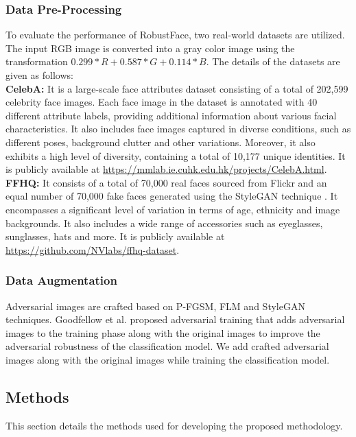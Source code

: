 \documentclass[sn-mathphys]{sn-jnl}%
\theoremstyle{thmstyleone}%
\theoremstyle{thmstyletwo}%
\theoremstyle{thmstylethree}%
\begin{document}
 \subsubsection{Data Pre-Processing}
 To evaluate the performance of  RobustFace, two real-world datasets are utilized. The input RGB image is converted into a gray color image using the transformation $0.299*R + 0.587*G + 0.114*B$. The details of the datasets are given as follows: \\
 \textbf{CelebA:} It is a large-scale face attributes dataset consisting of a total of 202,599 celebrity face images. Each face image in the dataset is annotated with 40 different attribute labels, providing additional information about various facial characteristics. It also includes face images captured in diverse conditions, such as different poses, background clutter and other variations. Moreover, it also exhibits a high level of diversity, containing a total of 10,177 unique identities. It is publicly available at \url{https://mmlab.ie.cuhk.edu.hk/projects/CelebA.html}. \\
 \textbf{FFHQ:}
 It consists of a total of 70,000 real faces sourced from Flickr and an equal number of 70,000 fake faces generated using the StyleGAN technique \cite{karras2019style}. It encompasses a significant level of variation in terms of age, ethnicity and image backgrounds. It also includes a wide range of accessories such as eyeglasses, sunglasses, hats and more. It is publicly available at \url{https://github.com/NVlabs/ffhq-dataset}.

 \subsubsection{Data Augmentation}
 Adversarial images are crafted based on P-FGSM, FLM and StyleGAN techniques. Goodfellow et al. \cite{goodfellow2014explaining} proposed adversarial training that adds adversarial images to the training phase along with the original images to improve the adversarial robustness of the classification model. We add crafted adversarial images along with the original images while training the classification model.  

 \subsection{Methods}
 This section details the methods used for developing the proposed methodology. 
 
\end{document}
